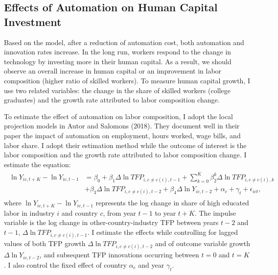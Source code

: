 \documentclass[12pt]{article}
\begin{document}
\subsection{Effects of Automation on Human Capital Investment}
Based on the model, after a reduction of automation cost, both automation and innovation rates increase. In the long run, workers respond to the change in technology by investing more in their human capital. As a result, we should observe an overall increase in human capital or an improvement in labor composition (higher ratio of skilled workers). To measure human capital growth, I use two related variables: the change in the share of skilled workers (college graduates) and the growth rate attributed to labor composition change. 

To estimate the effect of automation on labor composition, I adopt the local projection models in Autor and Salomons (2018)\nocite{AutorSalomons2018}. They document well in their paper the impact of automation on employment, hours worked, wage bills, and labor share. I adopt their estimation method while the outcome of interest is the labor composition and the growth rate attributed to labor composition change. I estimate the equation: 
\begin{align}
\begin{split}
\ln Y_{i c, t+K}-\ln Y_{i c, t-1}&=\beta_{0}+\beta_{1} \Delta \ln TFP_{i, c \neq c(i), t-1}+\sum_{k=0}^{K} \beta_{2}^{k} \Delta \ln TFP_{i, c \neq c(i), k} \\
&+\beta_{3} \Delta \ln TFP_{i, c \neq c(i), t-2}+\beta_{4} \Delta \ln Y_{i c, t-2}+\alpha_{c}+\gamma_{t}+\epsilon_{ict},
\end{split}
\end{align}
where $\ln Y_{i c, t+K}-\ln Y_{i c, t-1}$ represents the log change in share of high educated labor in industry $i$ and country $c$, from year $t-1$ to year $t+K$. The impulse variable is the log change in other-country-industry TFP between years $t-2$ and $t-1$, $\Delta \ln TFP_{i, c \neq c(i), t-1}$. I estimate the effects while controlling for lagged values of both TFP growth $\Delta \ln TFP_{i, c \neq c(i), t-2}$ and of outcome variable growth $\Delta \ln Y_{ic, t-2}$, and subsequent TFP innovations occurring between $t=0$ and $t=K$. I also control the fixed effect of country $\alpha_{c}$ and year $\gamma_{t}$. 
\end{document}
